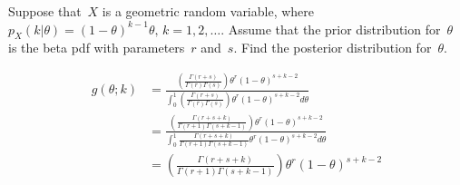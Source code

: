 \begin{problem}
   Suppose that~$X$ is a geometric random variable, where ${p_{X}(k\vert\theta) = (1-\theta)^{k-1}\theta\text{,  }k=1,2,\ldots}$. Assume that the prior distribution for~$\theta$ is the beta pdf with parameters~$r$ and~$s$.  Find the posterior distribution for~$\theta$.
\end{problem}

\begin{align}
  g(\theta;k) &= \frac{\left(\frac{\Gamma(r+s)}{\Gamma(r)\Gamma(s)}\right) \theta^{r} (1 - \theta)^{s+k-2}}{\int_{0}^{1} \left(\frac{\Gamma(r+s)}{\Gamma(r)\Gamma(s)}\right) \theta^{r} (1 - \theta)^{s+k-2} d\theta} \\
              &= \frac{\left(\frac{\Gamma(r+s+k)}{\Gamma(r+1)\Gamma(s+k-1)}\right) \theta^{r} (1 - \theta)^{s+k-2}}{\int_{0}^{1} \frac{\Gamma(r+s+k)}{\Gamma(r+1)\Gamma(s+k-1)} \theta^{r} (1 - \theta)^{s+k-2} d\theta} \\
              &= \left(\frac{\Gamma(r+s+k)}{\Gamma(r+1)\Gamma(s+k-1)}\right) \theta^{r} (1 - \theta)^{s+k-2}
\end{align}

